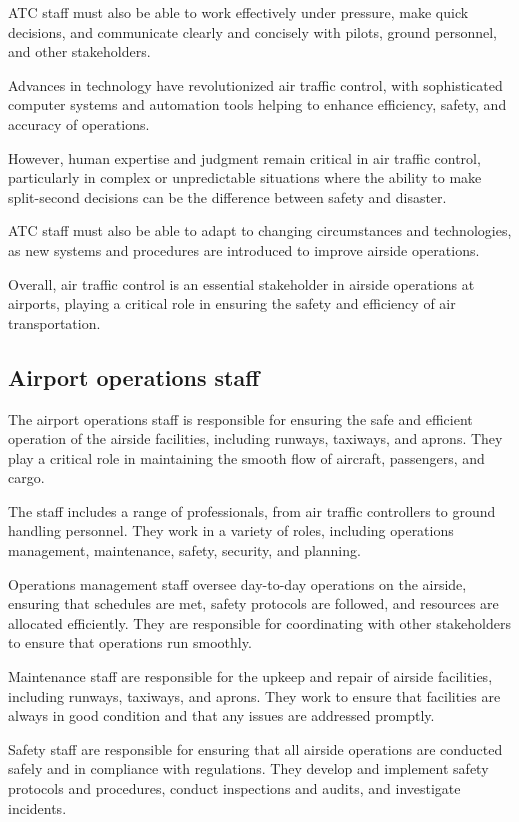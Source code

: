     ATC staff must also be able to work effectively under pressure, make quick decisions, and communicate clearly and concisely with pilots, ground personnel, and other stakeholders.
    
    Advances in technology have revolutionized air traffic control, with sophisticated computer systems and automation tools helping to enhance efficiency, safety, and accuracy of operations.
    
    However, human expertise and judgment remain critical in air traffic control, particularly in complex or unpredictable situations where the ability to make split-second decisions can be the difference between safety and disaster.
    
    ATC staff must also be able to adapt to changing circumstances and technologies, as new systems and procedures are introduced to improve airside operations.
    
    Overall, air traffic control is an essential stakeholder in airside operations at airports, playing a critical role in ensuring the safety and efficiency of air transportation.
    
    \subsection{Airport operations staff}

    The airport operations staff is responsible for ensuring the safe and efficient operation of the airside facilities, including runways, taxiways, and aprons. They play a critical role in maintaining the smooth flow of aircraft, passengers, and cargo.

    The staff includes a range of professionals, from air traffic controllers to ground handling personnel. They work in a variety of roles, including operations management, maintenance, safety, security, and planning.

    Operations management staff oversee day-to-day operations on the airside, ensuring that schedules are met, safety protocols are followed, and resources are allocated efficiently. They are responsible for coordinating with other stakeholders to ensure that operations run smoothly.

    Maintenance staff are responsible for the upkeep and repair of airside facilities, including runways, taxiways, and aprons. They work to ensure that facilities are always in good condition and that any issues are addressed promptly.

    Safety staff are responsible for ensuring that all airside operations are conducted safely and in compliance with regulations. They develop and implement safety protocols and procedures, conduct inspections and audits, and investigate incidents.

